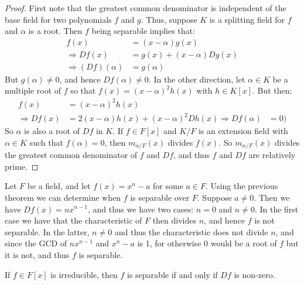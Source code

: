         \begin{proof}
            First note that the greatest common denominator is independent
            of the base field for two polynomials $f$ and $g$. Thus, suppose
            $K$ is a splitting field for $f$ and $\alpha$ is a root. Then
            $f$ being separable implies that:
            \begin{align}
                f(x)&=(x-\alpha)g(x)\\
                \Rightarrow{Df}(x)&=g(x)+(x-\alpha)Dg(x)\\
                \Rightarrow(Df)(\alpha)&=g(\alpha)
            \end{align}
            But $g(\alpha)\ne{0}$, and hence $Df(\alpha)\ne{0}$. In the
            other direction, let $\alpha\in{K}$ be a multiple root of $f$ so
            that $f(x)=(x-\alpha)^{2}h(x)$ with $h\in{K}[x]$. But then:
            \begin{align}
                f(x)&=(x-\alpha)^{2}h(x)\\
                \Rightarrow{Df}(x)&=2(x-\alpha)h(x)+(x-\alpha)^{2}Dh(x)
                \Rightarrow{Df}(\alpha)&=0)
            \end{align}
            So $\alpha$ is also a root of $Df$ in $K$.
            If $f\in{F}[x]$ and $K/F$ is an extension field with
            $\alpha\in{K}$ such that $f(\alpha)=0$, then $m_{\alpha/F}(x)$
            divides $f(x)$. So $m_{\alpha/F}(x)$ divides the greatest
            common denominator of $f$ and $Df$, and thus $f$ and $Df$ are
            relatively prime.
        \end{proof}
        \begin{example}
            Let $F$ be a field, and let $f(x)=x^{n}-a$ for some $a\in{F}$.
            Using the previous theorem we can determine when $f$ is
            separable over $F$. Suppose $a\ne{0}$. Then we have
            $Df(x)=nx^{n-1}$, and thus we have two cases: $n=0$ and
            $n\ne{0}$. In the first case we have that the characteristic of
            $F$ then divides $n$, and hence $f$ is not separable. In the
            latter, $n\ne{0}$ and thus the characteristic does not divide
            $n$, and since the GCD of $nx^{n-1}$ and $x^{n}-a$ is 1,
            for otherwise $0$ would be a root of $f$ but it is not, and thus
            $f$ is separable.
        \end{example}
        \begin{theorem}
            If $f\in{F}[x]$ is irreducible, then $f$ is separable if and
            only if $Df$ is non-zero.
        \end{theorem}
